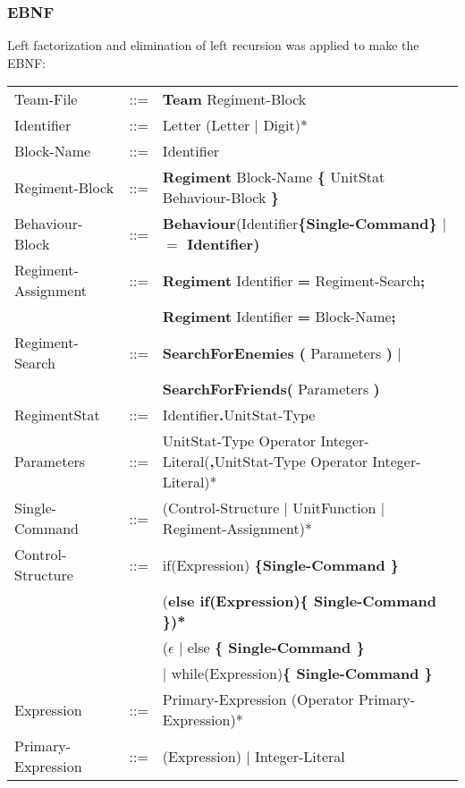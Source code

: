 	\subsubsection{EBNF}
		Left factorization and elimination of left recursion was applied to make the EBNF: \\
		\begin{center}
			\begin{longtable}{ l l l }
				\endfirsthead
				\endhead
	Team-File		   &	::=	 & {\bf Team} Regiment-Block \\
	Identifier 		   &    ::=  & Letter (Letter $\mid$ Digit)*\\
	Block-Name		   &	::=  & Identifier							\\
	Regiment-Block     &	::=	 & {\bf Regiment} Block-Name {\bf \{ } UnitStat Behaviour-Block \bf{\} }\\
	Behaviour-Block	   &	::=	 & {\bf Behaviour}(Identifier\bf{\{}Single-Command\bf{\}} $\mid$ {\bf $=$} Identifier)\\
	Regiment-Assignment&    ::=  &{\bf Regiment} Identifier {\bf =} Regiment-Search{\bf ;}\\
					   &         &{\bf Regiment} Identifier {\bf =} Block-Name{\bf ;}\\
	Regiment-Search	   &	::=	 &{\bf SearchForEnemies (} Parameters {\bf )} $\mid$\\
					   &		 & {\bf SearchForFriends(} Parameters {\bf )}	 \\
	RegimentStat 	   &	::=  & Identifier{\bf.}UnitStat-Type \\
	Parameters		   &	::=	 & UnitStat-Type Operator Integer-Literal({\bf ,}UnitStat-Type Operator Integer-Literal)*\\
	Single-Command     &	::=  & (Control-Structure $\mid$ UnitFunction $\mid$ Regiment-Assignment)*\\		
	Control-Structure  &  	::=  & if(Expression) \bf{\{}Single-Command \bf{\}}\\
					   &  	     & (\bf{else if(}Expression\bf{)\{ }Single-Command\bf{ \}})* \\
					   &		 & ($\epsilon$ $\mid$ else \bf{\{ }Single-Command \bf{\} }\\					   
					   &   		 & $\mid$ while(Expression)\bf{\{ } Single-Command \bf{\}}\\
	Expression 		   &	::=	 & Primary-Expression (Operator Primary-Expression)*\\
	Primary-Expression &	::=  & (Expression) $\mid$ Integer-Literal \\

\end{longtable}
\end{center}
